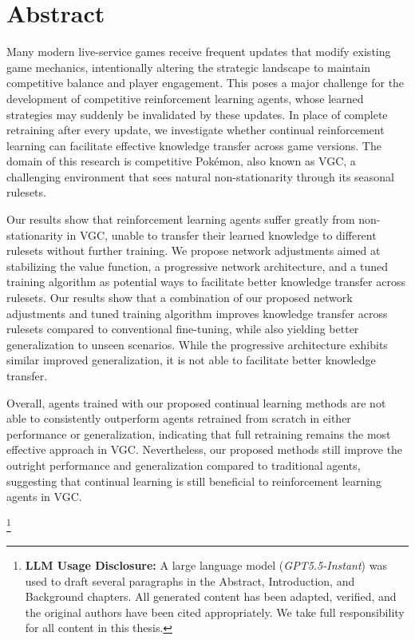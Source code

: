 %
%
\chapter*{Abstract}
Many modern live-service games receive frequent updates that modify existing game mechanics, intentionally altering the strategic landscape to maintain competitive balance and player engagement.
This poses a major challenge for the development of competitive reinforcement learning agents, whose learned strategies may suddenly be invalidated by these updates.
In place of complete retraining after every update, we investigate whether continual reinforcement learning can facilitate effective knowledge transfer across game versions.
The domain of this research is competitive Pokémon, also known as VGC, a challenging environment that sees natural non-stationarity through its seasonal rulesets.

Our results show that reinforcement learning agents suffer greatly from non-stationarity in VGC, unable to transfer their learned knowledge to different rulesets without further training.
We propose network adjustments aimed at stabilizing the value function, a progressive network architecture, and a tuned training algorithm as potential ways to facilitate better knowledge transfer across rulesets.
Our results show that a combination of our proposed network adjustments and tuned training algorithm improves knowledge transfer across rulesets compared to conventional fine-tuning, while also yielding better generalization to unseen scenarios.
While the progressive architecture exhibits similar improved generalization, it is not able to facilitate better knowledge transfer.

Overall, agents trained with our proposed continual learning methods are not able to consistently outperform agents retrained from scratch in either performance or generalization, indicating that full retraining remains the most effective approach in VGC.
Nevertheless, our proposed methods still improve the outright performance and generalization compared to traditional agents, suggesting that continual learning is still beneficial to reinforcement learning agents in VGC.

\begin{NoHyper}
    \renewcommand\thefootnote{}\footnote{\textbf{LLM Usage Disclosure:} A large language model (\textit{GPT5.5-Instant}) was used to draft several paragraphs in the Abstract, Introduction, and Background chapters. All generated content has been adapted, verified, and the original authors have been cited appropriately. We take full responsibility for all content in this thesis.}
    \addtocounter{footnote}{-1}
\end{NoHyper}
